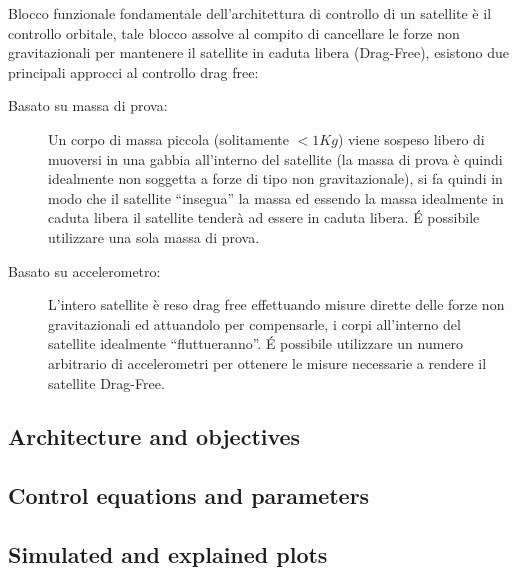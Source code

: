 Blocco funzionale fondamentale dell'architettura di controllo di un satellite è
il controllo orbitale, tale blocco assolve al compito di cancellare le forze
non gravitazionali per mantenere il satellite in caduta libera (Drag-Free),
esistono due principali approcci al controllo drag free:

\begin{description}
\item[Basato su massa di prova:]  Un corpo di massa piccola (solitamente
$<1Kg$) viene sospeso libero di muoversi in una gabbia all'interno del satellite
(la massa di prova è quindi idealmente non soggetta a forze di tipo non
gravitazionale), si fa quindi in modo che il satellite ``insegua'' la massa ed
essendo la massa idealmente in caduta libera il satellite tenderà ad essere in
caduta libera. \'E possibile utilizzare una sola massa di prova.
\item[Basato su accelerometro:] L'intero satellite è reso drag free effettuando
misure dirette delle forze non gravitazionali ed attuandolo per compensarle, i
corpi all'interno del satellite idealmente ``fluttueranno''. \'E possibile
utilizzare un numero arbitrario di accelerometri per ottenere le misure
necessarie a rendere il satellite Drag-Free.
\end{description}

\subsection{Architecture and objectives}

\subsection{Control equations and parameters}

\subsection{Simulated and explained plots}

